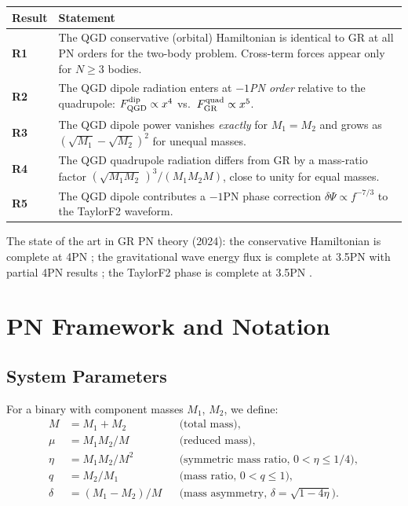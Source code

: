 \documentclass[11pt,a4paper]{article}
\newcommand{\Fp}{F_{\rm QGD}^{\rm dip}}
\newcommand{\Fq}{F_{\rm GR}^{\rm quad}}
\theoremstyle{definition}
\theoremstyle{remark}
\begin{document}
	\medskip
	\begin{center}
		\renewcommand{\arraystretch}{1.5}
		\begin{tabular}{lp{9cm}}
			\toprule
			Result & Statement \\
			\midrule
			\textbf{R1} & The QGD conservative (orbital) Hamiltonian is identical to
			GR at all PN orders for the two-body problem.
			Cross-term forces appear only for $N\geq3$ bodies. \\[4pt]
			\textbf{R2} & The QGD dipole radiation enters at \emph{$-1$PN order}
			relative to the quadrupole: $\Fp\propto x^4$ vs.\ $\Fq\propto x^5$. \\[4pt]
			\textbf{R3} & The QGD dipole power vanishes \emph{exactly} for $M_1=M_2$
			and grows as $({\sqrt{M_1}-\sqrt{M_2}})^2$ for unequal masses. \\[4pt]
			\textbf{R4} & The QGD quadrupole radiation differs from GR by a mass-ratio
			factor $(\sqrt{M_1 M_2}\,)^3/(M_1 M_2 M)$, close to unity for
			equal masses. \\[4pt]
			\textbf{R5} & The QGD dipole contributes a $-1$PN phase correction
			$\delta\Psi\propto f^{-7/3}$ to the TaylorF2 waveform. \\
			\bottomrule
		\end{tabular}
	\end{center}
	\medskip
	
	The state of the art in GR PN theory (2024): the conservative Hamiltonian
	is complete at 4PN \cite{Bern2021,Bernard2018}; the gravitational wave energy
	flux is complete at 3.5PN with partial 4PN results \cite{Blanchet2024};
	the TaylorF2 phase is complete at 3.5PN \cite{Blanchet2024LRR}.
	
	\section{PN Framework and Notation}
	\label{sec:notation}
	
	\subsection{System Parameters}
	
	For a binary with component masses $M_1$, $M_2$, we define:
	\begin{align}
		M &= M_1+M_2 & &\text{(total mass)}, \\
		\mu &= M_1 M_2/M & &\text{(reduced mass)}, \\
		\eta &= M_1 M_2/M^2 & &\text{(symmetric mass ratio, } 0<\eta\leq 1/4\text{)}, \\
		q &= M_2/M_1 & &\text{(mass ratio, } 0<q\leq1\text{)}, \\
		\delta &= (M_1-M_2)/M & &\text{(mass asymmetry, } \delta=\sqrt{1-4\eta}\text{)}.
	\end{align}
	
\end{document}
